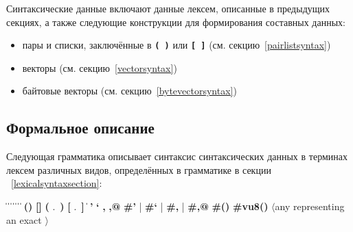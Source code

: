 Синтаксические данные включают данные лексем, описанные в предыдущих секциях, а также
следующие конструкции для формирования составных данных:
%
\begin{itemize}
\item пары и списки, заключённые в {\bfseries\verb|( )|} или {\bfseries\verb|[ ]|} (см.
  секцию~\ref{pairlistsyntax})
\item векторы (см. секцию~\ref{vectorsyntax})
\item байтовые векторы (см. секцию~\ref{bytevectorsyntax})
\end{itemize}

\subsection{Формальное описание}
\label{datumsyntax}

Следующая грамматика описывает синтаксис синтаксических данных в терминах лексем различных видов,
определённых в грамматике в секции ~\ref{lexicalsyntaxsection}:

{%
\renewcommand{\baselinestretch}{1.05}
\selectfont
\begin{grammar}%
 \: 
\>  \| 
 \:  \| 
\>  \|  \|  \|  
 \: 
 \:  \|  \| 
 \: \textbf{(}\textbf{)} \| \textbf{[}\textbf{]}
\>    \| \textbf{(} .\ \textbf{)} \| \textbf{[} .\ \textbf{]}
\>    \| 
 \:  
 \: \textbf{'} \| \textbf{`} \| \textbf{,} \| \textbf{,@}
\>    \| \textbf{\#'} | \textbf{\#`} | \textbf{\#,} | \textbf{\#,@}
 \: \textbf{\#(}\textbf{)}
 \: \textbf{\#vu8(}\textbf{)}
 \: $\langle${\rm any  representing an exact}
 \>\>\quad{}$\rangle$%
\end{grammar}

}

